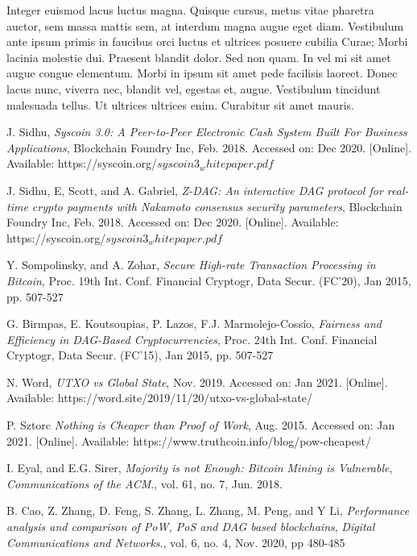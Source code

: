 \documentclass[peerreview]{ieeesyscoin}
\begin{document}
Integer euismod lacus luctus magna. Quisque cursus, metus vitae pharetra auctor, sem massa mattis sem, at interdum magna augue eget diam. Vestibulum ante ipsum primis in faucibus orci luctus et ultrices posuere cubilia Curae; Morbi lacinia molestie dui. Praesent blandit dolor. Sed non quam. In vel mi sit amet augue congue elementum. Morbi in ipsum sit amet pede facilisis laoreet. Donec lacus nunc, viverra nec, blandit vel, egestas et, augue. Vestibulum tincidunt malesuada tellus. Ut ultrices ultrices enim. Curabitur sit amet mauris. 

\begin{thebibliography}{00}


 J. Sidhu, \textit{Syscoin 3.0: A Peer-to-Peer Electronic Cash System Built For Business Applications}, Blockchain Foundry Inc, Feb. 2018. Accessed on: Dec 2020. [Online]. Available: https://syscoin.org/$syscoin3_whitepaper.pdf$

 J. Sidhu, E, Scott, and A. Gabriel, \textit{Z-DAG: An interactive DAG protocol for real-time crypto payments with Nakamoto consensus security parameters}, Blockchain Foundry Inc, Feb. 2018. Accessed on: Dec 2020. [Online]. Available: https://syscoin.org/$syscoin3_whitepaper.pdf$


 Y. Sompolinsky, and A. Zohar, \textit{Secure High-rate Transaction Processing in Bitcoin}, Proc. 19th Int. Conf. Financial Cryptogr, Data Secur. (FC’20), Jan 2015, pp. 507-527

 G. Birmpas, E. Koutsoupias, P. Lazos, F.J. Marmolejo-Cossío, \textit{Fairness and Efficiency in DAG-Based Cryptocurrencies}, Proc. 24th Int. Conf. Financial Cryptogr, Data Secur. (FC’15), Jan 2015, pp. 507-527


 N. Word, \textit{UTXO vs Global State}, Nov. 2019. Accessed on: Jan 2021. [Online]. Available: https://word.site/2019/11/20/utxo-vs-global-state/

 P. Sztorc \textit{Nothing is Cheaper than Proof of Work}, Aug. 2015. Accessed on: Jan 2021. [Online]. Available: https://www.truthcoin.info/blog/pow-cheapest/

 I. Eyal, and E.G. Sirer, \textit{Majority is not Enough: Bitcoin Mining is Vulnerable}, \emph{Communications of the ACM}., vol. 61, no. 7, Jun. 2018.

 B. Cao, Z. Zhang, D. Feng, S. Zhang, L. Zhang, M. Peng, and
Y Li, \textit{Performance analysis and comparison of PoW, PoS and DAG based blockchains}, \emph{Digital Communications and Networks}., vol. 6, no. 4, Nov. 2020, pp 480-485


\end{thebibliography}
\end{document}
